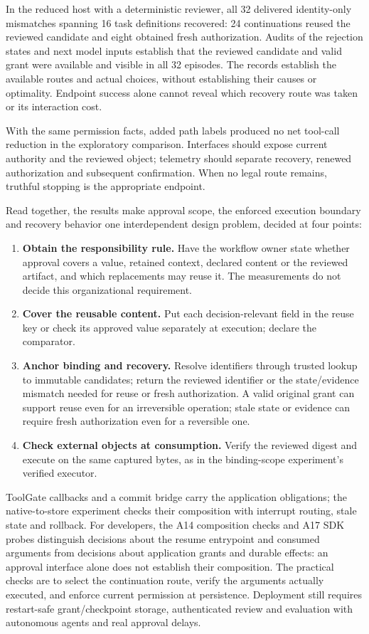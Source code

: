 \documentclass[pdflatex,sn-basic]{sn-jnl}
\providecommand{\tightlist}{\setlength{\itemsep}{0pt}\setlength{\parskip}{0pt}}
\begin{document}
In the reduced host with a deterministic reviewer, all 32 delivered identity-only mismatches spanning 16 task definitions recovered: 24 continuations reused the reviewed candidate and eight obtained fresh authorization. Audits of the rejection states and next model inputs establish that the reviewed candidate and valid grant were available and visible in all 32 episodes. The records establish the available routes and actual choices, without establishing their causes or optimality. Endpoint success alone cannot reveal which recovery route was taken or its interaction cost.

With the same permission facts, added path labels produced no net tool-call reduction in the exploratory comparison. Interfaces should expose current authority and the reviewed object; telemetry should separate recovery, renewed authorization and subsequent confirmation. When no legal route remains, truthful stopping is the appropriate endpoint.

Read together, the results make approval scope, the enforced execution boundary and recovery behavior one interdependent design problem, decided at four points:
\begin{enumerate}
\tightlist
\item \textbf{Obtain the responsibility rule.} Have the workflow owner state whether approval covers a value, retained context, declared content or the reviewed artifact, and which replacements may reuse it. The measurements do not decide this organizational requirement.
\item \textbf{Cover the reusable content.} Put each decision-relevant field in the reuse key or check its approved value separately at execution; declare the comparator.
\item \textbf{Anchor binding and recovery.} Resolve identifiers through trusted lookup to immutable candidates; return the reviewed identifier or the state/evidence mismatch needed for reuse or fresh authorization. A valid original grant can support reuse even for an irreversible operation; stale state or evidence can require fresh authorization even for a reversible one.
\item \textbf{Check external objects at consumption.} Verify the reviewed digest and execute on the same captured bytes, as in the binding-scope experiment's verified executor.
\end{enumerate}

ToolGate callbacks and a commit bridge carry the application obligations; the native-to-store experiment checks their composition with interrupt routing, stale state and rollback. For developers, the A14 composition checks and A17 SDK probes distinguish decisions about the resume entrypoint and consumed arguments from decisions about application grants and durable effects: an approval interface alone does not establish their composition. The practical checks are to select the continuation route, verify the arguments actually executed, and enforce current permission at persistence. Deployment still requires restart-safe grant/checkpoint storage, authenticated review and evaluation with autonomous agents and real approval delays.
\end{document}
